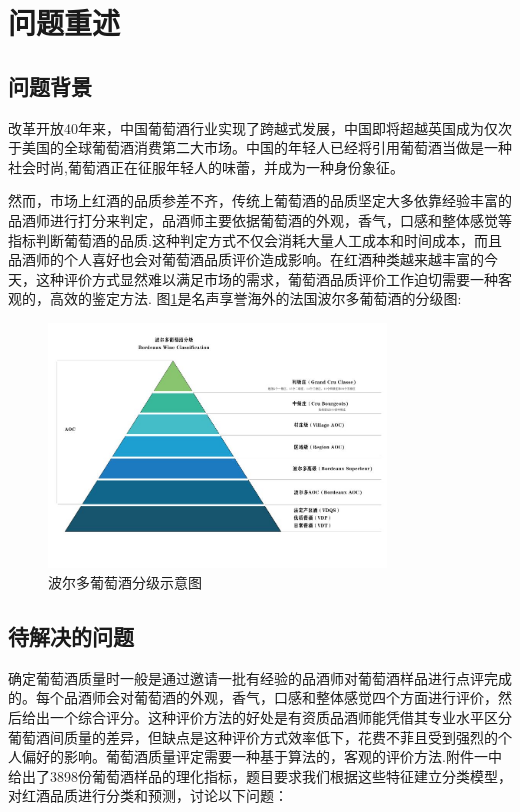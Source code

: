 \documentclass{whutmod}
\begin{document}
\tableofcontents
\newpage

\section{问题重述}
\subsection{问题背景}
改革开放40年来，中国葡萄酒行业实现了跨越式发展，中国即将超越英国成为仅次于美国的全球葡萄酒消费第二大市场。中国的年轻人已经将引用葡萄酒当做是一种社会时尚,葡萄酒正在征服年轻人的味蕾，并成为一种身份象征。

然而，市场上红酒的品质参差不齐，传统上葡萄酒的品质坚定大多依靠经验丰富的品酒师进行打分来判定，品酒师主要依据葡萄酒的外观，香气，口感和整体感觉等指标判断葡萄酒的品质.这种判定方式不仅会消耗大量人工成本和时间成本，而且品酒师的个人喜好也会对葡萄酒品质评价造成影响。在红酒种类越来越丰富的今天，这种评价方式显然难以满足市场的需求，葡萄酒品质评价工作迫切需要一种客观的，高效的鉴定方法.
图\ref{boerduo}是名声享誉海外的法国波尔多葡萄酒的分级图:
\begin{figure}[!htbp]
	\centering
	\includegraphics[width=0.8\textwidth]{boerduo3.jpg}
	\caption{波尔多葡萄酒分级示意图}
	\label{boerduo}
\end{figure} 


\subsection{待解决的问题}
确定葡萄酒质量时一般是通过邀请一批有经验的品酒师对葡萄酒样品进行点评完成的。每个品酒师会对葡萄酒的外观，香气，口感和整体感觉四个方面进行评价，然后给出一个综合评分。这种评价方法的好处是有资质品酒师能凭借其专业水平区分葡萄酒间质量的差异，但缺点是这种评价方式效率低下，花费不菲且受到强烈的个人偏好的影响。葡萄酒质量评定需要一种基于算法的，客观的评价方法.附件一中给出了3898份葡萄酒样品的理化指标，题目要求我们根据这些特征建立分类模型，对红酒品质进行分类和预测，讨论以下问题：
\end{document}
